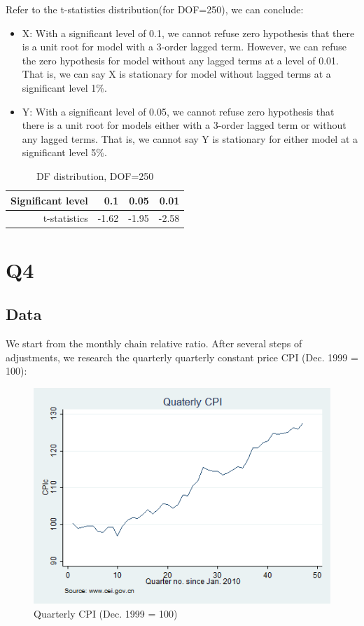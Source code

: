 \documentclass{article}
\begin{document}
Refer to the t-statistics distribution(for DOF=250), we can conclude:
\begin{itemize}
  \item X: With a significant level of 0.1, we cannot refuse zero hypothesis that there is a unit root for model with a 3-order lagged term. However, we can refuse the zero hypothesis for model without any lagged terms at a level of 0.01. That is, we can say X is stationary for model without lagged terms at a significant level 1\%.
  \item Y: With a significant level of 0.05, we cannot refuse zero hypothesis that there is a unit root for models either with a 3-order lagged term or without any lagged terms. That is, we cannot say Y is stationary for either model at a significant level 5\%.
\end{itemize}

\begin{table}[!h]
\centering
\begin{tabular}{rrrr}

Significant level  &          0.1 &          0.05  & 0.01\\
\hline
\hline
t-statistics &     -1.62 &        -1.95 &-2.58\\

\hline
\end{tabular}  
\caption{DF distribution, DOF=250}
\end{table}


\section{Q4}
\subsection{Data}
We start from the monthly chain relative ratio. After several steps of adjustments, we research the quarterly quarterly constant price CPI (Dec. 1999 = 100):
\begin{figure}[!h]
\centering
\includegraphics[width = 0.6\linewidth]{CPI.png}
\caption{Quarterly CPI (Dec. 1999 = 100)}
\end{figure}
\end{document}
